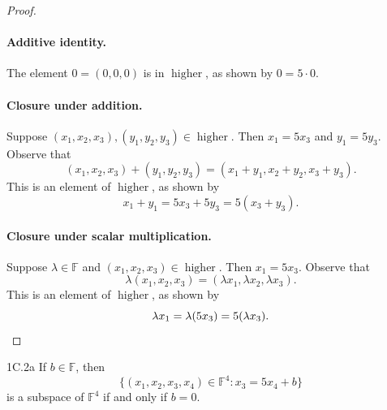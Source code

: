 \documentclass{exam}
\begin{document}
\begin{proof}
    \paragraph{Additive identity.} The element $0 = (0, 0, 0)$ is in $\operatorname{higher}$, as shown by $0 = 5\cdot0$.

    \paragraph{Closure under addition.} Suppose $(x_1, x_2, x_3),(y_1,y_2,y_3)\in\operatorname{higher}$. Then $x_1 = 5x_3$ and $y_1= 5y_3$. Observe that \[
    (x_1, x_2, x_3) + (y_1, y_2, y_3) = (x_1 + y_1, x_2 + y_2, x_3 + y_3).
    \]
    This is an element of $\operatorname{higher}$, as shown by \[
        x_1 + y_1 = 5x_3 + 5y_3 = 5(x_3 + y_3).
    \]

    \paragraph{Closure under scalar multiplication.} Suppose $\lambda\in\mathbb F$ and $(x_1, x_2, x_3) \in\operatorname{higher}$. Then $x_1 = 5x_3$. Observe that \[
        \lambda(x_1, x_2, x_3) = (\lambda x_1, \lambda x_2, \lambda x_3).
    \]
    This is an element of $\operatorname{higher}$, as shown by \[
        \lambda x_1 = \lambda(5x_3) = 5(\lambda x_3). \qedhere
    \]
\end{proof}

\begin{problem}{1C.2a}
    If $b\in\mathbb F$, then $$\{(x_1, x_2, x_3, x_4) \in \mathbb F^4: x_3 = 5x_4 + b\}$$ is a subspace of $\mathbb F^4$ if and only if $b = 0$.
\end{problem}
\end{document}

